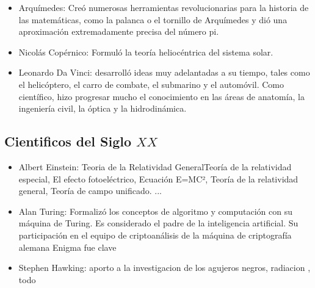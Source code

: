 \documentclass[11pt]{article}
\begin{document}
\begin{itemize}
  \item  Arquímedes: Creó numerosas herramientas revolucionarias para la historia de las matemáticas, como la palanca o el tornillo de Arquímedes y dió una aproximación extremadamente precisa del número pi.
  \item Nicolás Copérnico: Formuló la teoría heliocéntrica del sistema solar.
  \item  Leonardo Da Vinci: desarrolló ideas muy adelantadas a su tiempo, tales como el helicóptero, el carro de combate, el submarino y el automóvil. Como científico, hizo progresar mucho el conocimiento en las áreas de anatomía, la ingeniería civil, la óptica y la hidrodinámica.
\end{itemize}

\subsection{Cientificos del Siglo $XX$}
\begin{itemize}
  \item Albert Einstein\cite{einstein}: Teoria de la Relatividad GeneralTeoría de la relatividad especial, El efecto fotoeléctrico, Ecuación E=MC²,  Teoría de la relatividad general, Teoría de campo unificado. ... 
  \item Alan Turing: Formalizó los conceptos de algoritmo y computación con su máquina de Turing. Es considerado el padre de la inteligencia artificial. Su participación en el equipo de criptoanálisis de la máquina de criptografía alemana Enigma fue clave
  \item Stephen Hawking:  aporto a la investigacion de los agujeros negros, \gls{radiacion} , \gls{todo} 
\end{itemize}
\end{document}
